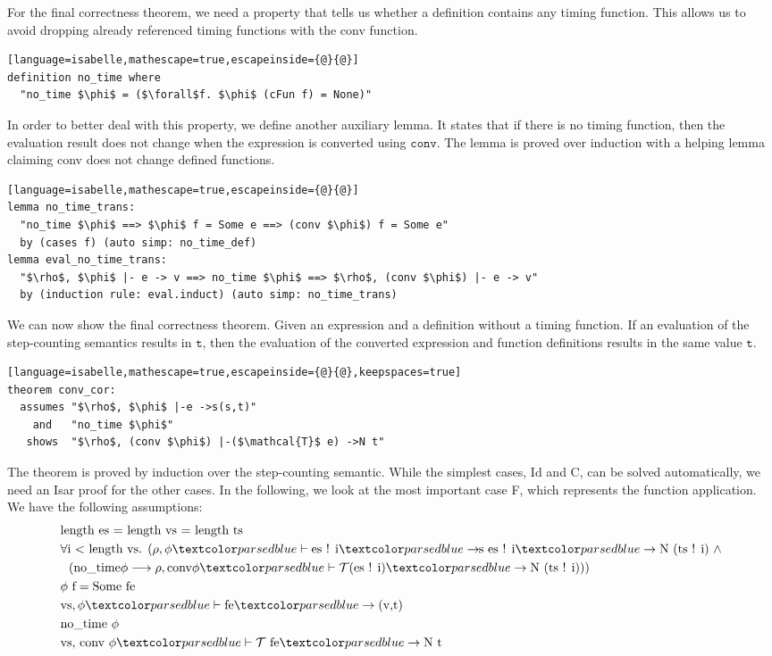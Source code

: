 For the final correctness theorem, we need a property that tells us whether a definition contains any timing function.
This allows us to avoid dropping already referenced timing functions with the conv function.
\begin{lstlisting}[language=isabelle,mathescape=true,escapeinside={@}{@}]
definition no_time where
  "no_time $\phi$ = ($\forall$f. $\phi$ (cFun f) = None)"
\end{lstlisting}

In order to better deal with this property, we define another auxiliary lemma.
It states that if there is no timing function, then the evaluation result does not change when the expression is converted using $\texttt{conv}$.
The lemma is proved over induction with a helping lemma claiming conv does not change defined functions.
\begin{lstlisting}[language=isabelle,mathescape=true,escapeinside={@}{@}]
lemma no_time_trans:
  "no_time $\phi$ ==> $\phi$ f = Some e ==> (conv $\phi$) f = Some e"
  by (cases f) (auto simp: no_time_def)
lemma eval_no_time_trans:
  "$\rho$, $\phi$ |- e -> v ==> no_time $\phi$ ==> $\rho$, (conv $\phi$) |- e -> v"
  by (induction rule: eval.induct) (auto simp: no_time_trans)
\end{lstlisting}

We can now show the final correctness theorem.
Given an expression and a definition without a timing function.
If an evaluation of the step-counting semantics results in $\texttt{t}$, then the evaluation of the converted expression and function definitions results in the same value $\texttt{t}$.
\begin{lstlisting}[language=isabelle,mathescape=true,escapeinside={@}{@},keepspaces=true]
theorem conv_cor:
  assumes "$\rho$, $\phi$ |-e ->s(s,t)"
    and   "no_time $\phi$"
   shows  "$\rho$, (conv $\phi$) |-($\mathcal{T}$ e) ->N t"
\end{lstlisting}

The theorem is proved by induction over the step-counting semantic.
While the simplest cases, Id and C, can be solved automatically, we need an Isar proof for the other cases.
In the following, we look at the most important case F, which represents the function application.
We have the following assumptions:
\begin{align}
  &\text{length es = length vs = length ts} \label{cor:len}\\
  &\forall\text{i < length vs. } (\rho, \phi \hvdash \text{es ! i} \hrightarrows \text{es ! i} \hrightarrow \text{N (ts ! i)}\ \land \label{cor:args}\\
  &\ \ (\text{no\_time} \phi \longrightarrow \rho, \text{conv} \phi \hvdash \mathcal{T} \text{(es ! i)} \hrightarrow \text{N (ts ! i)}))\nonumber\\
  &\phi\ \text{f} = \text{Some fe} \label{cor:phi}\\
  &\text{vs}, \phi \hvdash \text{fe} \hrightarrow \text{(v,t)} \label{cor:feeval}\\
  &\text{no\_time}\ \phi \label{cor:notime}\\
  &\text{vs, conv}\ \phi \hvdash \mathcal{T}\ \text{fe} \hrightarrow \text{N t} \label{cor:Tfeeval}
\end{align}

